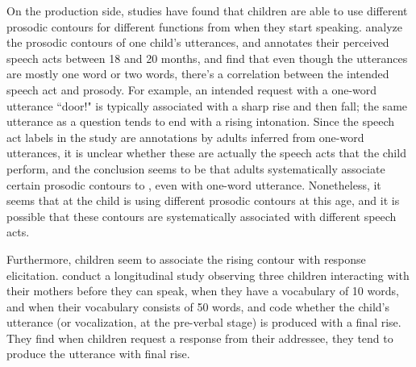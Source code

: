 On the production side, studies have found that children are able to use different prosodic contours for different functions from when they start speaking. \textcite{menyuk1969prosody} analyze the prosodic contours of one child's utterances, and annotates their perceived speech acts between 18  and 20 months, and find that even though the utterances are mostly one word or two words, there's a correlation between the intended speech act and prosody. For example, an intended request with a one-word utterance ``door!" is typically associated with a sharp rise and then fall; the same utterance as a question tends to end with a rising intonation. Since the speech act labels in the study are annotations by adults inferred from one-word utterances, it is unclear whether these are actually the speech acts that the child perform, and the conclusion seems to be that adults systematically associate certain prosodic contours to \aqrs{}, even with one-word utterance. Nonetheless, it seems that at the child is using different prosodic contours at this age, and it is possible that these contours are systematically associated with different speech acts. 


Furthermore, children seem to associate the rising contour with response elicitation. \textcite{flax1991prosody} conduct a longitudinal study observing three children interacting with their mothers before they can speak, when they have a vocabulary of 10 words, and when their vocabulary consists of 50 words, and code whether the child's utterance (or vocalization, at the pre-verbal stage) is produced with a final rise. They find when children request a response from their addressee, they tend to produce the utterance with final rise. 

